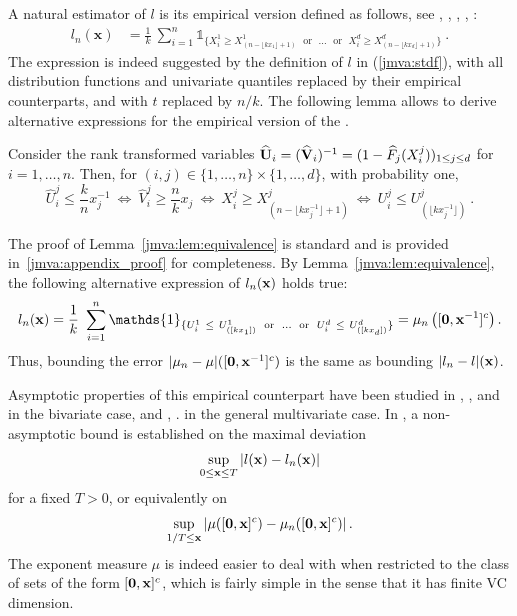 A natural estimator of $l$ is its empirical version defined as
follows,  see \cite{Huangphd}, \cite{Qi97}, \cite{Drees98}, \cite{Einmahl2006}, \cite{COLT15}:
\begin{align}\label{jmva:empir-Stdf}
l_n(\mathbf{x}) &= \frac{1}{k}~\sum_{i=1}^{n} \mathds{1}_{\{ X_i^1 \ge
  X^1_{(n-\lfloor kx_1 \rfloor+1)}  \text{~~or~~} \ldots \text{~~or~~}
  X_i^d \ge  X^d_{(n-\lfloor kx_d\rfloor+1)}  \}}~.
\end{align}
The expression is indeed suggested by the definition of $l$ in  (\ref{jmva:stdf}), with all distribution functions and  univariate quantiles replaced by their empirical counterparts, and with $t$  replaced by $n/k$.
The following lemma allows to derive alternative expressions for the empirical version of the \stdf.  
\begin{lemma}
\label{jmva:lem:equivalence}
Consider the rank transformed variables 
$\mathbf{  \widehat U}_i = (\mathbf{ \widehat V}_i)^{-1} = ( 1- \widehat F_j
(X_i^j))_{1\leq j\leq d}$ for $i = 1, \ldots, n$. Then, for $(i,j)\in \{1,\ldots, n\}\times \{1,\ldots,d\}$,
with probability one,
$$
\widehat U_i^j \le \frac{k}{n} x_j^{-1} ~\Leftrightarrow~
\widehat V_i^j \ge \frac{n}{k} x_j ~\Leftrightarrow~
X_i^j \ge X_{(n-\lfloor  kx_j^{-1} \rfloor +1)}^j ~\Leftrightarrow~
U_i^j \le U_{(\lfloor kx_j^{-1}\rfloor)}^j~.
$$
\end{lemma}
The proof of Lemma~\ref{jmva:lem:equivalence} is standard and is provided in~\ref{jmva:appendix_proof} for completeness.
By Lemma~\ref{jmva:lem:equivalence}, the following alternative expression of $l_n(\mathbf x)$ holds true:
\begin{align}\label{jmva:empir-Stdf2}
l_n(\mb x)=\frac{1}{k} ~\sum_{i=1}^{n} \mathds{1}_{ \{U_i^1 ~\le~ U^1_{([kx_1])} \text{~~or~~} \ldots \text{~~or~~}  U_i^d ~\le~ U^d_{([kx_d])} \}}= \mu_n \left( [\mb 0, \mb x^{-1}]^c \right).
\end{align}
Thus, bounding the error $|\mu_n - \mu|([\mathbf 0,\mathbf x^{-1}]^c)$ is the same as
bounding $|l_n - l|(\mathbf x)$. 

Asymptotic properties of this empirical counterpart have been studied
in \cite{Huangphd}, \cite{Drees98}, \cite{Embrechts2000} and
\cite{dHF06} in the bivariate case, and \cite{Qi97},
\cite{Einmahl2012}. 
in the general multivariate
 case. 
In \cite{COLT15}, a non-asymptotic bound is established on the maximal deviation $$\sup_{0 \le \mathbf x \le T} |l(\mathbf x) - l_n(\mathbf x)|$$ for a fixed $T>0$, or equivalently on 
$$ \sup_{1/T \le \mathbf x } \left|\mu ( [\mathbf 0, \mathbf x]^c ) - \mu_n ( [\mathbf 0, \mathbf x]^c )\right|. $$
\noindent
The exponent measure $\mu$ is indeed easier to deal with when restricted to the class of sets of the form $[\mathbf 0, \mathbf x]^c$, which is fairly simple in the sense that it has finite VC dimension. %






